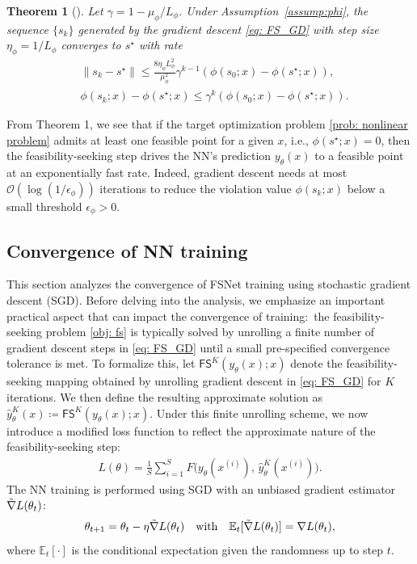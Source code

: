 \documentclass{article}
\def\FS{\mathsf{FS}}
\def\tgrad{\Tilde{\nabla}}
\newcommand{\bigO}{\mathcal{O}}
\newtheorem{theorem}{Theorem}
\def\x{x}
\def\y{y_{\theta}}   \def\hy{\hat{y}_{\theta}}    \def\ty{\Tilde{y}}
\def\i{{(i)}}
\begin{document}
\begin{theorem}[\cite{polyak1963gradient}] \label{thm: fs convergence}
    Let $\gamma = 1 - \mu_\phi/{L_\phi}$. 
    Under Assumption~\ref{assump:phi}, the sequence $\{s_k\}$ generated by the gradient descent \eqref{eq: FS_GD} with step size $\eta_\phi = 1/L_\phi$ converges to $s^\star$ with rate
    \begin{align}
        &\| s_k - s^\star \| \leq \frac{8 \eta_\phi L_\phi^2}{\mu_\phi^2} \gamma^{k-1} (\phi(s_0; \x) - \phi(s^\star; \x)),
         \label{eq: thm1-eq1}\\
        &\phi(s_k;\x) - \phi(s^\star; \x) \leq \gamma^k (\phi(s_0;\x) - \phi(s^\star; \x)). \label{eq: thm1-eq2}
    \end{align}
\end{theorem}
From Theorem 1, we see that if the target optimization problem \eqref{prob: nonlinear problem} admits at least one feasible point for a given $\x$, i.e.,  $\phi(s^\star; \x) = 0$, then the feasibility-seeking step drives the NN's prediction $\y(\x)$ to a feasible point at an exponentially fast rate. 
Indeed, gradient descent needs at most $\bigO (\log(1/{\epsilon_\phi}))$ iterations to reduce the violation value $\phi(s_k;\x)$ below a small threshold $\epsilon_\phi>0$. 

\subsection{Convergence of NN training}
\label{subsec:nn-converge}
This section analyzes the convergence of FSNet training using stochastic gradient descent (SGD). 
Before delving into the analysis, we emphasize an important practical aspect that can impact the convergence of training:~the feasibility-seeking problem \eqref{obj: fs} is typically solved by unrolling a finite number of gradient descent steps in \eqref{eq: FS_GD} until a small pre-specified convergence tolerance is met.
To formalize this, let $\FS^K(\y(\x); \x)$ denote the feasibility-seeking mapping obtained by unrolling gradient descent in \eqref{eq: FS_GD} for $K$ iterations. 
We then define the resulting approximate solution as  $\hy^K(\x) \coloneqq \FS^K(\y(\x); \x)$. 
Under this finite unrolling scheme, we now introduce a modified loss function to reflect the approximate nature of the feasibility-seeking step:
\begin{align}\label{eq: approx loss}
    L(\theta) = \frac{1}{S} \sum_{i=1}^S F\big(\y(\x^\i), \, \hy^K(\x^\i)\big).
\end{align}
The NN training is performed using SGD with an unbiased gradient estimator $\tgrad L(\theta_t)$:
\begin{align}\label{eq: SGD}
    \theta_{t+1} = \theta_t - \eta \tgrad L(\theta_t) \quad \text{with} \quad \mathbb{E}_t[\tgrad L(\theta_t)] = \nabla L(\theta_t),
\end{align}
where $\mathbb{E}_t[\cdot]$ is the conditional expectation given the randomness up to step $t$.
\end{document}
